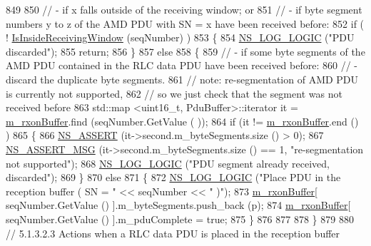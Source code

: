 \begin{DoxyCode}
849 
850       \textcolor{comment}{// - if x falls outside of the receiving window; or}
851       \textcolor{comment}{// - if byte segment numbers y to z of the AMD PDU with SN = x have been received before:}
852       \textcolor{keywordflow}{if} ( ! \hyperlink{classns3_1_1LteRlcAm_a278f6dd09bf7c65bd85fab4ece7ff11a}{IsInsideReceivingWindow} (seqNumber) )
853         \{
854           \hyperlink{group__logging_ga88acd260151caf2db9c0fc84997f45ce}{NS\_LOG\_LOGIC} (\textcolor{stringliteral}{"PDU discarded"});
855           \textcolor{keywordflow}{return};
856         \}
857       \textcolor{keywordflow}{else}
858         \{
859           \textcolor{comment}{// - if some byte segments of the AMD PDU contained in the RLC data PDU have been received
       before:}
860           \textcolor{comment}{//         - discard the duplicate byte segments.}
861           \textcolor{comment}{// note: re-segmentation of AMD PDU is currently not supported, }
862           \textcolor{comment}{// so we just check that the segment was not received before}
863           std::map <uint16\_t, PduBuffer>::iterator it = \hyperlink{classns3_1_1LteRlcAm_a7442b4f97fccd0c393dd9f27325a853a}{m\_rxonBuffer}.find (seqNumber.GetValue (
      ));
864           \textcolor{keywordflow}{if} (it != \hyperlink{classns3_1_1LteRlcAm_a7442b4f97fccd0c393dd9f27325a853a}{m\_rxonBuffer}.end () )
865             \{
866               \hyperlink{assert_8h_a6dccdb0de9b252f60088ce281c49d052}{NS\_ASSERT} (it->second.m\_byteSegments.size () > 0);
867               \hyperlink{assert_8h_aff5ece9066c74e681e74999856f08539}{NS\_ASSERT\_MSG} (it->second.m\_byteSegments.size () == 1, \textcolor{stringliteral}{"re-segmentation not
       supported"});
868               \hyperlink{group__logging_ga88acd260151caf2db9c0fc84997f45ce}{NS\_LOG\_LOGIC} (\textcolor{stringliteral}{"PDU segment already received, discarded"});
869             \}
870           \textcolor{keywordflow}{else}
871             \{
872               \hyperlink{group__logging_ga88acd260151caf2db9c0fc84997f45ce}{NS\_LOG\_LOGIC} (\textcolor{stringliteral}{"Place PDU in the reception buffer ( SN = "} << seqNumber << \textcolor{stringliteral}{" )"});
873               \hyperlink{classns3_1_1LteRlcAm_a7442b4f97fccd0c393dd9f27325a853a}{m\_rxonBuffer}[ seqNumber.GetValue () ].m\_byteSegments.push\_back (p);
874               \hyperlink{classns3_1_1LteRlcAm_a7442b4f97fccd0c393dd9f27325a853a}{m\_rxonBuffer}[ seqNumber.GetValue () ].m\_pduComplete = \textcolor{keyword}{true};
875             \}
876 
877 
878         \}
879 
880       \textcolor{comment}{// 5.1.3.2.3 Actions when a RLC data PDU is placed in the reception buffer}

\end{DoxyCode}
